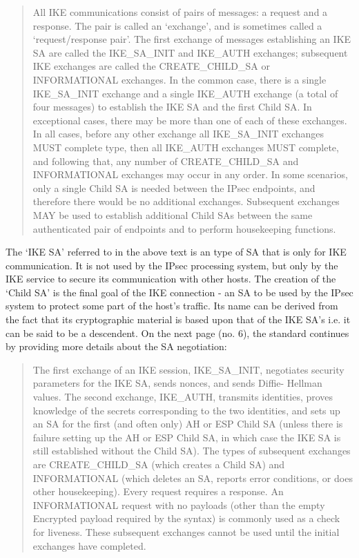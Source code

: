 \documentclass[final,a4paper,twoside,11pt,onecolumn]{report}
\begin{document}
\begin{quotation}
All IKE communications consist of pairs of messages: a request and a response. The pair is called an `exchange', and is sometimes called a `request/response pair'. The first exchange of messages establishing an IKE SA are called the IKE\_SA\_INIT and IKE\_AUTH exchanges; subsequent IKE exchanges are called the CREATE\_CHILD\_SA or INFORMATIONAL exchanges. In the common case, there is a single IKE\_SA\_INIT exchange and a single IKE\_AUTH exchange (a total of four messages) to establish the IKE SA and the first Child SA. In exceptional cases, there may be more than one of each of these exchanges. In all cases, before any other exchange all IKE\_SA\_INIT exchanges MUST complete type, then all IKE\_AUTH exchanges MUST complete, and following that, any number of CREATE\_CHILD\_SA and INFORMATIONAL exchanges may occur in any order. In some scenarios, only a single Child SA is needed between the IPsec endpoints, and therefore there would be no additional exchanges. Subsequent exchanges MAY be used to establish additional Child SAs between the same authenticated pair of endpoints and to perform housekeeping functions.
\end{quotation}

The `IKE SA' referred to in the above text is an type of SA that is only for IKE communication. It is not used by the IPsec processing system, but only by the IKE service to secure its communication with other hosts. The creation of the `Child SA' is the final goal of the IKE connection - an SA to be used by the IPsec system to protect some part of the host's traffic. Its name can be derived from the fact that its cryptographic material is based upon that of the IKE SA's i.e. it can be said to be a descendent. On the next page (no. 6), the standard continues by providing more details about the SA negotiation:

\begin{quotation}
The first exchange of an IKE session, IKE\_SA\_INIT, negotiates security parameters for the IKE SA, sends nonces, and sends Diffie- Hellman values. The second exchange, IKE\_AUTH, transmits identities, proves knowledge of the secrets corresponding to the two identities, and sets up an SA for the first (and often only) AH or ESP Child SA (unless there is failure setting up the AH or ESP Child SA, in which case the IKE SA is still established without the Child SA). The types of subsequent exchanges are CREATE\_CHILD\_SA (which creates a Child SA) and INFORMATIONAL (which deletes an SA, reports error conditions, or does other housekeeping). Every request requires a response. An INFORMATIONAL request with no payloads (other than the empty Encrypted payload required by the syntax) is commonly used as a check for liveness. These subsequent exchanges cannot be used until the initial exchanges have completed.
\end{quotation}
\end{document}
